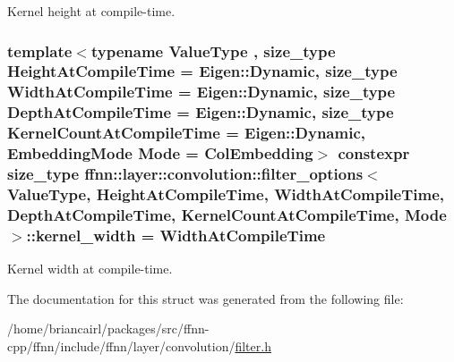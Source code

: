 Kernel height at compile-\/time. 

\hypertarget{structffnn_1_1layer_1_1convolution_1_1filter__options_a0c003de4b336a7443b2aa5a7f78cc29c}{
\subsubsection[{kernel\-\_\-width}]{\setlength{\rightskip}{0pt plus 5cm}template$<$typename Value\-Type , size\-\_\-type Height\-At\-Compile\-Time = Eigen\-::\-Dynamic, size\-\_\-type Width\-At\-Compile\-Time = Eigen\-::\-Dynamic, size\-\_\-type Depth\-At\-Compile\-Time = Eigen\-::\-Dynamic, size\-\_\-type Kernel\-Count\-At\-Compile\-Time = Eigen\-::\-Dynamic, Embedding\-Mode Mode = Col\-Embedding$>$ constexpr {\bf size\-\_\-type} {\bf ffnn\-::layer\-::convolution\-::filter\-\_\-options}$<$ Value\-Type, Height\-At\-Compile\-Time, Width\-At\-Compile\-Time, Depth\-At\-Compile\-Time, Kernel\-Count\-At\-Compile\-Time, Mode $>$\-::kernel\-\_\-width = Width\-At\-Compile\-Time\hspace{0.3cm}{\ttfamily [static]}}}\label{structffnn_1_1layer_1_1convolution_1_1filter__options_a0c003de4b336a7443b2aa5a7f78cc29c}


Kernel width at compile-\/time. 



The documentation for this struct was generated from the following file\-:\begin{DoxyCompactItemize}
\item 
/home/briancairl/packages/src/ffnn-\/cpp/ffnn/include/ffnn/layer/convolution/\hyperlink{filter_8h}{filter.\-h}\end{DoxyCompactItemize}
